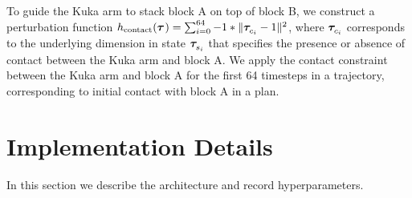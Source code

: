 \begin{appendices}
 To guide the Kuka arm to stack block A on top of block B, we construct a perturbation function $h_{\text{contact}}(\bm{\tau}^{}) = \sum_{i=0}^{64} -1 * \|\bm{\tau}^{}_{c_i} - 1\|^2$, where $\bm{\tau}^{}_{c_i}$ corresponds to the underlying dimension in state $\bm{\tau}^{}_{s_i}$ that specifies the presence or absence of contact between the Kuka arm and block A.  We apply the contact constraint between the Kuka arm and block A for the first 64 timesteps in a trajectory, corresponding to initial contact with block A in a plan.



\section{Implementation Details}

In this section we describe the architecture and record hyperparameters.


\end{appendices}
